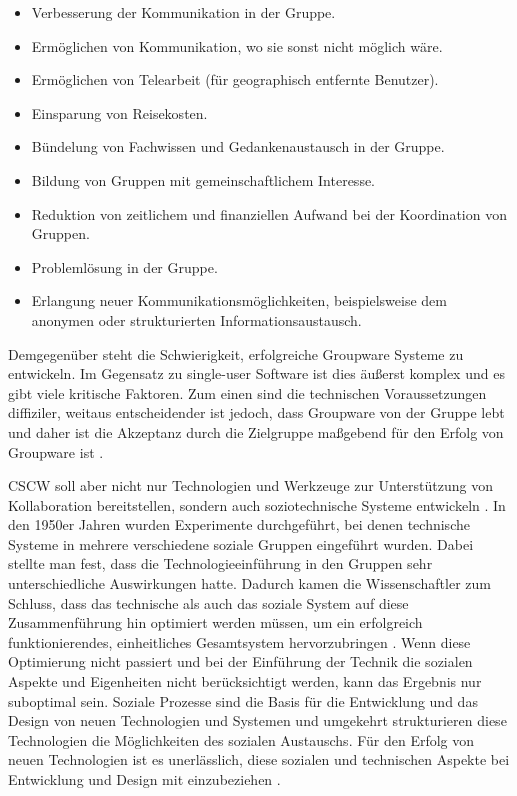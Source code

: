 	\begin{itemize}
		\item {Verbesserung der Kommunikation in der Gruppe.}
		\item {Ermöglichen von Kommunikation, wo sie sonst nicht möglich wäre.}
		\item {Ermöglichen von Telearbeit (für geographisch entfernte Benutzer).}
		\item {Einsparung von Reisekosten.}
		\item {Bündelung von Fachwissen und Gedankenaustausch in der Gruppe.}
		\item {Bildung von Gruppen mit gemeinschaftlichem Interesse.}
		\item {Reduktion von zeitlichem und finanziellen Aufwand bei der Koordination von Gruppen.}
		\item {Problemlösung in der Gruppe.}
		\item {Erlangung neuer Kommunikationsmöglichkeiten, beispielsweise dem anonymen oder strukturierten Informationsaustausch.}
	\end{itemize}
	\begin{flushright}
		\citep{Gerlicher:2007p241}
	\end{flushright}
	
	Demgegenüber steht die Schwierigkeit, erfolgreiche Groupware Systeme zu entwickeln. Im Gegensatz zu single-user Software ist dies äußerst komplex und es gibt viele kritische Faktoren. Zum einen sind die technischen Voraussetzungen diffiziler, weitaus entscheidender ist jedoch, dass Groupware von der Gruppe lebt und daher ist die Akzeptanz durch die Zielgruppe maßgebend für den Erfolg von Groupware ist \citep{Gerlicher:2007p241}.
	
	\medskip CSCW soll aber nicht nur Technologien und Werkzeuge zur Unterstützung von Kollaboration bereitstellen, sondern auch soziotechnische Systeme entwickeln \citep{Koch2008}. In den 1950er Jahren wurden Experimente durchgeführt, bei denen technische Systeme in mehrere verschiedene soziale Gruppen eingeführt wurden. Dabei stellte man fest, dass die Technologieeinführung in den Gruppen sehr unterschiedliche Auswirkungen hatte. Dadurch kamen die Wissenschaftler zum Schluss, dass das technische als auch das soziale System auf diese Zusammenführung hin optimiert werden müssen, um ein erfolgreich funktionierendes, einheitliches Gesamtsystem hervorzubringen \citep{Koch2008}. Wenn diese Optimierung nicht passiert und bei der Einführung der Technik die sozialen Aspekte und Eigenheiten nicht berücksichtigt werden, kann das Ergebnis nur suboptimal sein. Soziale Prozesse sind die Basis für die Entwicklung und das Design von neuen Technologien und Systemen und umgekehrt strukturieren diese Technologien die Möglichkeiten des sozialen Austauschs. Für den Erfolg von neuen Technologien ist es unerlässlich, diese sozialen und technischen Aspekte bei Entwicklung und Design mit einzubeziehen \citep{Mumford:2000}.
	
